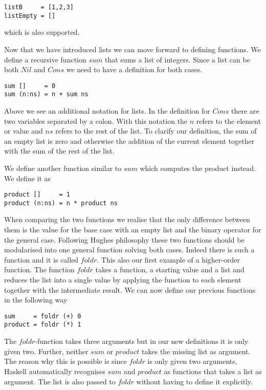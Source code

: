 \documentclass[conference]{IEEEtran}
\begin{document}
\begin{lstlisting}[]
listB     = [1,2,3]
listEmpty = []

\end{lstlisting}
which is also supported. 

Now that we have introduced lists we can move forward to defining functions. We define a recursive function $sum$ that sums a list of integers. Since a list can be both $Nil$ and $Cons$ we need to have a definition for both cases.

\begin{lstlisting}[]
sum []     = 0
sum (n:ns) = n + sum ns
\end{lstlisting}
Above we see an additional notation for lists. In the definition for $Cons$ there are two variables separated by a colon. With this notation the $n$ refers to the element or value and $ns$ refers to the rest of the list. To clarify our definition, the sum of an empty list is zero and otherwise the addition of the current element together with the sum of the rest of the list.

We define another function similar to $sum$ which computes the product instead. We define it as

\begin{lstlisting}[]
product []     = 1
product (n:ns) = n * product ns
\end{lstlisting}
When comparing the two functions we realise that the only difference between them is the value for the base case with an empty list and the binary operator for the general case. Following Hughes philosophy these two functions should be modularised into one general function solving both cases. Indeed there is such a function and it is called $foldr$. This also our first example of a higher-order function. The function $foldr$ takes a function, a starting value and a list and reduces the list into a single value by applying the function to each element together with the intermediate result. We can now define our previous functions in the following way 

\begin{lstlisting}[]
sum 	= foldr (+) 0
product = foldr (*) 1
\end{lstlisting}
The $foldr$-function takes three arguments but in our new definitions it is only given two. Further, neither $sum$ or $product$ takes the missing list as argument. The reason why this is possible is since $foldr$ is only given two arguments, Haskell automatically recognises $sum$ and $product$ as functions that takes a list as argument. The list is also passed to $foldr$ without having to define it explicitly. 
\end{document}
